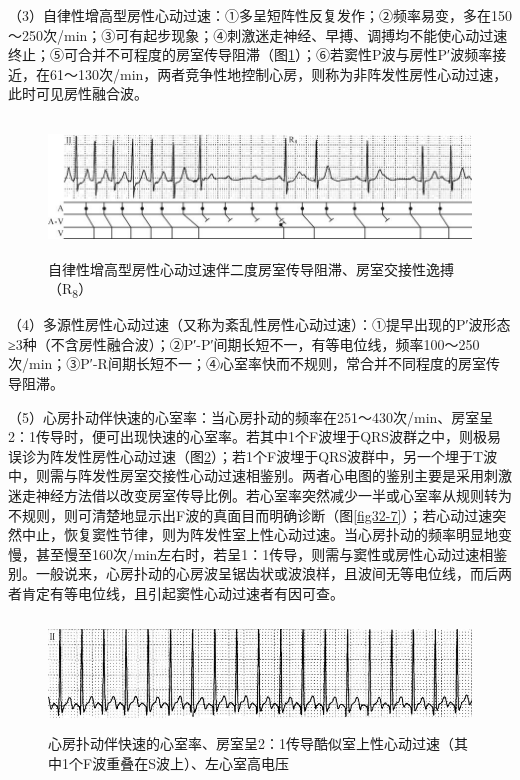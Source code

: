 （3）自律性增高型房性心动过速：①多呈短阵性反复发作；②频率易变，多在150～250次/min；③可有起步现象；④刺激迷走神经、早搏、调搏均不能使心动过速终止；⑤可合并不可程度的房室传导阻滞（图\ref{fig32-5}）；⑥若窦性P波与房性P′波频率接近，在61～130次/min，两者竞争性地控制心房，则称为非阵发性房性心动过速，此时可见房性融合波。

\begin{figure}[!htbp]
 \centering
 \includegraphics[width=5.80208in,height=1.42708in]{./images/Image00521.jpg}
 \captionsetup{justification=centering}
 \caption{自律性增高型房性心动过速伴二度房室传导阻滞、房室交接性逸搏（R\textsubscript{8}）}
 \label{fig32-5}
  \end{figure} 


（4）多源性房性心动过速（又称为紊乱性房性心动过速）：①提早出现的P′波形态≥3种（不含房性融合波）；②P′-P′间期长短不一，有等电位线，频率100～250次/min；③P′-R间期长短不一；④心室率快而不规则，常合并不同程度的房室传导阻滞。

（5）心房扑动伴快速的心室率：当心房扑动的频率在251～430次/min、房室呈2：1传导时，便可出现快速的心室率。若其中1个F波埋于QRS波群之中，则极易误诊为阵发性房性心动过速（图\ref{fig32-6}）；若1个F波埋于QRS波群中，另一个埋于T波中，则需与阵发性房室交接性心动过速相鉴别。两者心电图的鉴别主要是采用刺激迷走神经方法借以改变房室传导比例。若心室率突然减少一半或心室率从规则转为不规则，则可清楚地显示出F波的真面目而明确诊断（图\ref{fig32-7}）；若心动过速突然中止，恢复窦性节律，则为阵发性室上性心动过速。当心房扑动的频率明显地变慢，甚至慢至160次/min左右时，若呈1：1传导，则需与窦性或房性心动过速相鉴别。一般说来，心房扑动的心房波呈锯齿状或波浪样，且波间无等电位线，而后两者肯定有等电位线，且引起窦性心动过速者有因可查。

\begin{figure}[!htbp]
 \centering
 \includegraphics[width=5.58333in,height=1.16667in]{./images/Image00522.jpg}
 \captionsetup{justification=centering}
 \caption{心房扑动伴快速的心室率、房室呈2：1传导酷似室上性心动过速（其中1个F波重叠在S波上）、左心室高电压}
 \label{fig32-6}
  \end{figure} 


